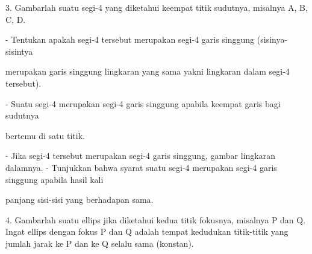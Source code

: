 \documentclass[a4paper,10pt]{article}
\begin{document}
\begin{eulernotebook}
\begin{eulercomment}
\begin{eulercomment}
\begin{eulercomment}
\begin{eulercomment}
\begin{eulercomment}
\begin{eulercomment}
\begin{eulercomment}
\begin{eulercomment}
\begin{eulercomment}
\begin{eulercomment}
\begin{eulercomment}
\begin{eulercomment}
\begin{eulercomment}
\begin{eulercomment}
\begin{eulercomment}
\begin{eulercomment}
\begin{eulercomment}
\begin{eulercomment}
\begin{eulercomment}
\begin{eulercomment}
\begin{eulercomment}
\begin{eulercomment}
\begin{eulercomment}
\begin{eulercomment}
\begin{eulercomment}
\begin{eulercomment}
\begin{eulercomment}
\begin{eulercomment}
\begin{eulercomment}
\begin{eulercomment}
\begin{eulercomment}
\begin{eulercomment}
\begin{eulercomment}
\begin{eulercomment}
\begin{eulercomment}
3. Gambarlah suatu segi-4 yang diketahui keempat titik sudutnya, misalnya A, B, C, D.\\
\end{eulercomment}
\begin{eulerttcomment}
   - Tentukan apakah segi-4 tersebut merupakan segi-4 garis singgung (sisinya-sisintya
\end{eulerttcomment}
\begin{eulercomment}
merupakan garis singgung lingkaran yang sama yakni lingkaran dalam segi-4 tersebut).\\
\end{eulercomment}
\begin{eulerttcomment}
   - Suatu segi-4 merupakan segi-4 garis singgung apabila keempat garis bagi sudutnya
\end{eulerttcomment}
\begin{eulercomment}
bertemu di satu titik.\\
\end{eulercomment}
\begin{eulerttcomment}
   - Jika segi-4 tersebut merupakan segi-4 garis singgung, gambar lingkaran dalamnya.
   - Tunjukkan bahwa syarat suatu segi-4 merupakan segi-4 garis singgung apabila hasil kali
\end{eulerttcomment}
\begin{eulercomment}
panjang sisi-sisi yang berhadapan sama.

4. Gambarlah suatu ellips jika diketahui kedua titik fokusnya, misalnya P dan Q. Ingat
ellips dengan fokus P dan Q adalah tempat kedudukan titik-titik yang jumlah jarak ke P dan
ke Q selalu sama (konstan).


\end{eulercomment}
\end{eulercomment}
\end{eulercomment}
\end{eulercomment}
\end{eulercomment}
\end{eulercomment}
\end{eulercomment}
\end{eulercomment}
\end{eulercomment}
\end{eulercomment}
\end{eulercomment}
\end{eulercomment}
\end{eulercomment}
\end{eulercomment}
\end{eulercomment}
\end{eulercomment}
\end{eulercomment}
\end{eulercomment}
\end{eulercomment}
\end{eulercomment}
\end{eulercomment}
\end{eulercomment}
\end{eulercomment}
\end{eulercomment}
\end{eulercomment}
\end{eulercomment}
\end{eulercomment}
\end{eulercomment}
\end{eulercomment}
\end{eulercomment}
\end{eulercomment}
\end{eulercomment}
\end{eulercomment}
\end{eulercomment}
\end{eulercomment}
\end{eulernotebook}
\end{document}
